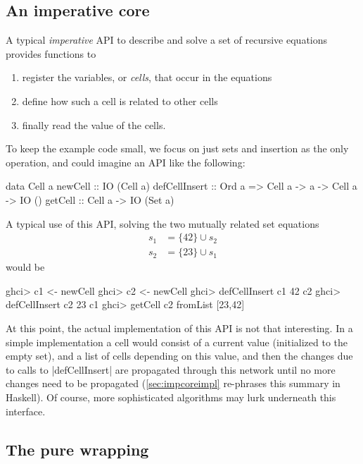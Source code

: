 \documentclass[manuscript,screen,acmsmall,nonacm]{acmart}
\begin{document}
\subsection{An imperative core}\label{sec:impcore}

A typical \emph{imperative} API to describe and solve a set of recursive equations provides functions to
\begin{enumerate}
\item register the variables, or \emph{cells}, that occur in the equations
\item define how such a cell is related to other cells
\item finally read the value of the cells.
\end{enumerate}
To keep the example code small, we focus on just sets and insertion as the only operation, and could imagine an API like the following:

\begin{minipage}{\linewidth}
\begin{code}
data Cell a
newCell        ::                                      IO (Cell a)
defCellInsert  ::  Ord a =>  Cell a -> a -> Cell a ->  IO ()
getCell        ::            Cell a ->                 IO (Set a)
\end{code}
\end{minipage}

A typical use of this API, solving the two mutually related set equations
\begin{align*}
s_1 &= \{ 42 \} \cup s_2 \\
s_2 &= \{ 23 \} \cup s_1
\end{align*}
would be
\begin{code}
ghci> c1 <- newCell
ghci> c2 <- newCell
ghci> defCellInsert c1 42 c2
ghci> defCellInsert c2 23 c1
ghci> getCell c2
fromList [23,42]
\end{code}

At this point, the actual implementation of this API is not that interesting. In a simple implementation a cell would consist of a current value (initialized to the empty set), and a list of cells depending on this value, and then the changes due to calls to |defCellInsert| are propagated through this network until no more changes need to be propagated (\cref{sec:impcoreimpl} re-phrases this summary in Haskell). Of course, more sophisticated algorithms may lurk underneath this interface.

\subsection{The pure wrapping}
\end{document}
